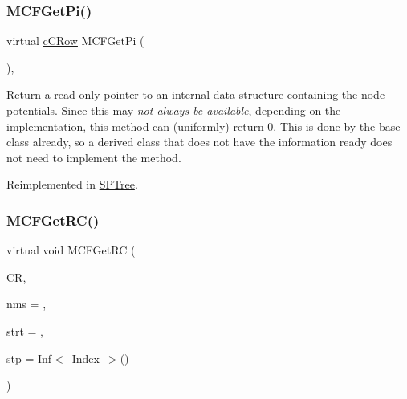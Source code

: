 \mbox{\label{class_m_c_f_class_a8f1a95d5c707f83ffc6aecba1e7e0e10}} 
\subsubsection{\texorpdfstring{M\+C\+F\+Get\+Pi()}{MCFGetPi()}\hspace{0.1cm}{\footnotesize\ttfamily [2/2]}}
{\footnotesize\ttfamily virtual \mbox{\hyperlink{class_m_c_f_class_ab700102e9ba8bb6015be6818d4e99097}{c\+C\+Row}} M\+C\+F\+Get\+Pi (\begin{DoxyParamCaption}\item[{void}]{ }\end{DoxyParamCaption})\hspace{0.3cm}{\ttfamily [inline]}, {\ttfamily [virtual]}}

Return a read-\/only pointer to an internal data structure containing the node potentials. Since this may {\itshape not always be available}, depending on the implementation, this method can (uniformly) return 0. This is done by the base class already, so a derived class that does not have the information ready does not need to implement the method. 

Reimplemented in \mbox{\hyperlink{class_s_p_tree_a2eb8e4b396fb6d82d56dcb9b7fbe871b}{S\+P\+Tree}}.

\mbox{\label{class_m_c_f_class_a361d84ae42041fdbf3824d45fc4c54aa}} 
\subsubsection{\texorpdfstring{M\+C\+F\+Get\+R\+C()}{MCFGetRC()}\hspace{0.1cm}{\footnotesize\ttfamily [1/3]}}
{\footnotesize\ttfamily virtual void M\+C\+F\+Get\+RC (\begin{DoxyParamCaption}\item[{\mbox{\hyperlink{class_m_c_f_class_a62409402be4e4b301e1a568f99f877be}{C\+Row}}}]{CR,  }\item[{\mbox{\hyperlink{class_m_c_f_class_a81575b2d4e4d5636b17170432150ae69}{c\+Index\+\_\+\+Set}}}]{nms = {},  }\item[{\mbox{\hyperlink{class_m_c_f_class_a76aaabb20535c51a2752b93f6c38fe54}{c\+Index}}}]{strt = {},  }\item[{\mbox{\hyperlink{class_m_c_f_class_ad53d6229d7ec28555a9c9c2fd9abf773}{Index}}}]{stp = {\ttfamily \mbox{\hyperlink{class_o_p_ttypes__di__unipi__it_1_1_inf}{Inf}}$<$~\mbox{\hyperlink{class_m_c_f_class_ad53d6229d7ec28555a9c9c2fd9abf773}{Index}}~$>$()} }\end{DoxyParamCaption})\hspace{0.3cm}{\ttfamily [pure virtual]}}

